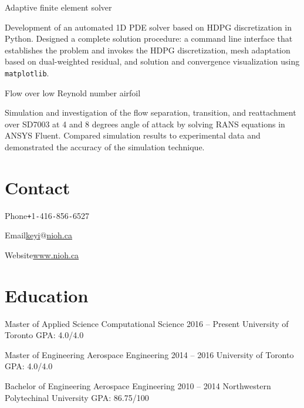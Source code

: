 \documentclass{tccv}
\begin{document}
\begin{eventlist}
  {Adaptive finite element solver}

  Development of an automated 1D PDE solver based on HDPG discretization in Python. Designed a complete solution procedure: a command line interface that establishes the problem and invokes the HDPG discretization, mesh adaptation based on dual-weighted residual, and solution and convergence visualization using \texttt{matplotlib}.

  {Flow over low Reynold number airfoil}
  
  Simulation and investigation of the flow separation, transition, and reattachment over SD7003 at 4 and 8 degrees angle of attack by solving RANS equations in ANSYS Fluent. Compared simulation results to experimental data and demonstrated the accuracy of the simulation technique.

  


\end{eventlist}
\needspace{0.5\textheight}
\section{Contact}
\begin{factlist}
  \item{Phone}{\texttt{+}1\texttt{-}416\texttt{-}856\texttt{-}6527}
  \item{Email}{\href{mailto:keyi@nioh.ca}{keyi$@$nioh.ca}}
  \item{Website}{\href{https://nioh.ca}{www.nioh.ca}}
\end{factlist}

\section{Education}
\begin{yearlist}
  \item[Master of Applied Science \newline Computational Science]{2016 -- Present}
  {University of Toronto}
  {GPA: 4.0/4.0}
  \item[Master of Engineering \newline Aerospace Engineering]{2014 -- 2016}
  {University of Toronto}
  {GPA: 4.0/4.0}
  \item[Bachelor of Engineering \newline Aerospace Engineering]{2010 -- 2014}
  {Northwestern Polytechinal University}
  {GPA: 86.75/100}
\end{yearlist}
\end{document}
